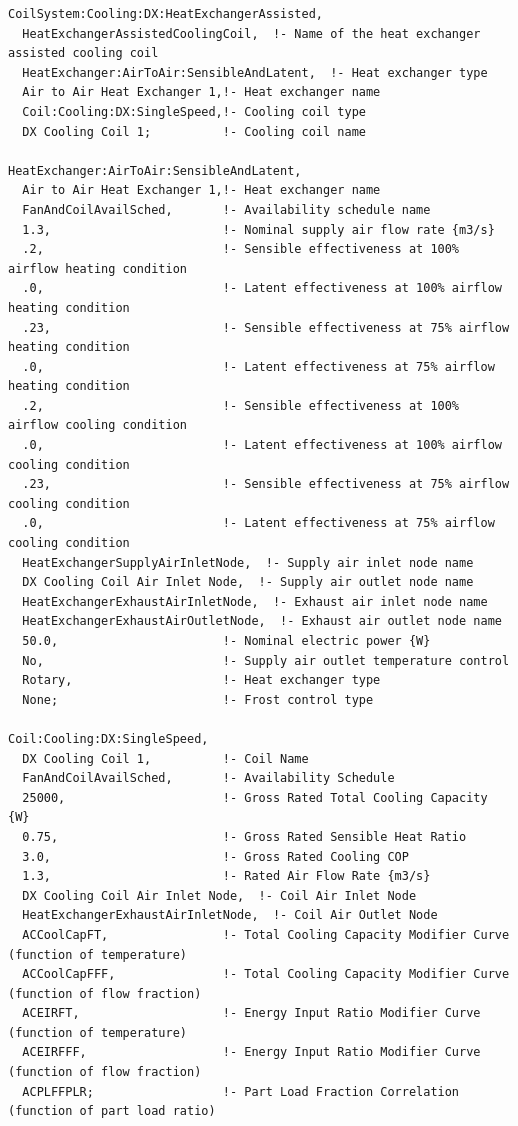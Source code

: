 \begin{lstlisting}
CoilSystem:Cooling:DX:HeatExchangerAssisted,
  HeatExchangerAssistedCoolingCoil,  !- Name of the heat exchanger assisted cooling coil
  HeatExchanger:AirToAir:SensibleAndLatent,  !- Heat exchanger type
  Air to Air Heat Exchanger 1,!- Heat exchanger name
  Coil:Cooling:DX:SingleSpeed,!- Cooling coil type
  DX Cooling Coil 1;          !- Cooling coil name

HeatExchanger:AirToAir:SensibleAndLatent,
  Air to Air Heat Exchanger 1,!- Heat exchanger name
  FanAndCoilAvailSched,       !- Availability schedule name
  1.3,                        !- Nominal supply air flow rate {m3/s}
  .2,                         !- Sensible effectiveness at 100% airflow heating condition
  .0,                         !- Latent effectiveness at 100% airflow heating condition
  .23,                        !- Sensible effectiveness at 75% airflow heating condition
  .0,                         !- Latent effectiveness at 75% airflow heating condition
  .2,                         !- Sensible effectiveness at 100% airflow cooling condition
  .0,                         !- Latent effectiveness at 100% airflow cooling condition
  .23,                        !- Sensible effectiveness at 75% airflow cooling condition
  .0,                         !- Latent effectiveness at 75% airflow cooling condition
  HeatExchangerSupplyAirInletNode,  !- Supply air inlet node name
  DX Cooling Coil Air Inlet Node,  !- Supply air outlet node name
  HeatExchangerExhaustAirInletNode,  !- Exhaust air inlet node name
  HeatExchangerExhaustAirOutletNode,  !- Exhaust air outlet node name
  50.0,                       !- Nominal electric power {W}
  No,                         !- Supply air outlet temperature control
  Rotary,                     !- Heat exchanger type
  None;                       !- Frost control type

Coil:Cooling:DX:SingleSpeed,
  DX Cooling Coil 1,          !- Coil Name
  FanAndCoilAvailSched,       !- Availability Schedule
  25000,                      !- Gross Rated Total Cooling Capacity {W}
  0.75,                       !- Gross Rated Sensible Heat Ratio
  3.0,                        !- Gross Rated Cooling COP
  1.3,                        !- Rated Air Flow Rate {m3/s}
  DX Cooling Coil Air Inlet Node,  !- Coil Air Inlet Node
  HeatExchangerExhaustAirInletNode,  !- Coil Air Outlet Node
  ACCoolCapFT,                !- Total Cooling Capacity Modifier Curve (function of temperature)
  ACCoolCapFFF,               !- Total Cooling Capacity Modifier Curve (function of flow fraction)
  ACEIRFT,                    !- Energy Input Ratio Modifier Curve (function of temperature)
  ACEIRFFF,                   !- Energy Input Ratio Modifier Curve (function of flow fraction)
  ACPLFFPLR;                  !- Part Load Fraction Correlation (function of part load ratio)
\end{lstlisting}

